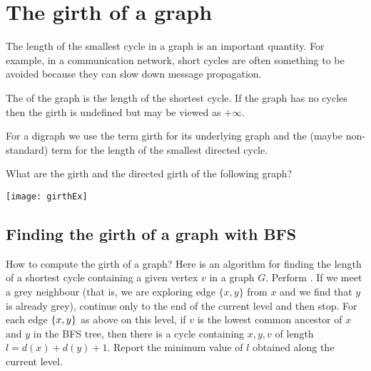 \section{The girth of a graph}
\label{sec:girth}

The length of the smallest cycle in a graph is an important quantity. 
For example, in a communication network, short cycles are often something to be
avoided because they can slow down message propagation.

\begin{Definition}
The  of the graph is the length of the shortest cycle. If the graph has no cycles then the
girth is undefined but may be viewed as $+\infty$. 

For a digraph we use the term girth for its underlying graph and the (maybe non-standard) term  for
the length of the smallest directed cycle.
\end{Definition}

\begin{Boxample}[0]
What are the girth and the directed girth of the following graph?
\begin{center}
\texttt{[image: girthEx]}
\end{center}
\end{Boxample}


\subsection{Finding the girth of a graph with BFS}
How to compute the girth of a graph? Here is an algorithm for finding
the length of a shortest cycle containing a given vertex $v$ in a graph
$G$. Perform . If we meet a grey neighbour (that is,
we are exploring edge $\{x, y\}$ from $x$ and we find that $y$ is already
grey), continue only to the end of the current level and then stop. For
each edge $\mbox{$\{x, y\}$}$ as above on this level, if $v$ is the lowest
common ancestor of $x$ and $y$ in the BFS tree, then there is a cycle
containing $x, y, v$ of length $l=d(x) + d(y) + 1$. Report the minimum
value of $l$ obtained along the current level.

